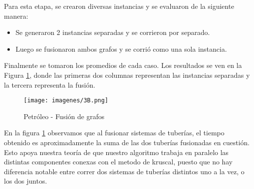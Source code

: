 Para esta etapa, se crearon diversas instancias y se evaluaron de la siguiente manera:

\begin{itemize}
	\item Se generaron 2 instancias separadas y se corrieron por separado.
	\item Luego se fusionaron ambos grafos y se corrió como una sola instancia.
\end{itemize}

Finalmente se tomaron los promedios de cada caso.  Los resultados se ven en la Figura \ref{fig:3B}, donde las primeras dos columnas representan las instancias separadas y la tercera representa la fusión.


\begin{figure}[htb]
	\begin{center}
    		\texttt{[image: imagenes/3B.png]}
	\end{center}
	\caption{Petróleo - Fusión de grafos}\label{fig:3B}
\end{figure}


En la figura \ref{fig:3B} observamos que al fusionar sistemas de tuberías, el tiempo obtenido es aproximadamente la suma de las dos tuberías fusionadas en cuestión. Esto apoya nuestra teoría de que nuestro algoritmo trabaja en paralelo las distintas componentes conexas con el metodo de kruscal, puesto que no hay diferencia notable entre correr dos sistemas de tuberías distintos uno a la vez, o los dos juntos. 
